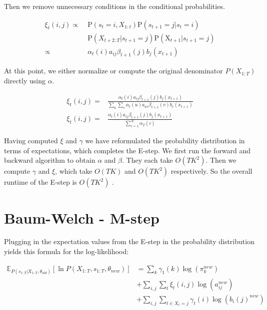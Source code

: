 Then we remove unnecessary conditions in the conditional probabilities.

\begin{equation}
\begin{aligned}
\xi_{t}(i, j) \propto \; &\mathrm{P}\left(s_{t}=i, X_{1: t}\right) \mathrm{P}\left(s_{t+1}=j | s_{t}=i\right) \\
&\mathrm{P}\left(X_{t+2: T} | s_{t+1}=j\right) \mathrm{P}\left(\mathrm{X}_{t+1} | s_{t+1}=j\right) \\
\propto \;  & \alpha_{t}(i) a_{i j} \beta_{t+1}(j) b_{j}(x_{t+1})
\end{aligned} 
\end{equation}

At this point, we either normalize or compute the original denominator $P(X_{1:T})$ directly using $\alpha$.

\begin{equation}
\begin{aligned}
\xi_{t}(i, j)=&\frac{\alpha_{t}(i) a_{i j} \beta_{t+1}(j) b_{j}(x_{t+1})}{\sum_{u} \sum_{v} \alpha_{t}(u) a_{u v} \beta_{t+1}(v) b_{v}( x_{t+1})} \\
\xi_{t}(i, j)=&\frac{\alpha_{t}(i) a_{i j} \beta_{t+1}(j) b_{j} (x_{t+1})}{\sum_{i=1}^{N} \alpha_{T}(i)}
\label{eq:xi-def}
\end{aligned}
\end{equation}

Having computed $\xi$ and $\gamma$ we have reformulated the probability distribution in terms of expectations, which completes the E-step. We first run the forward and backward algorithm to obtain $\alpha$ and $\beta$. They each take $O(TK^2)$. Then we compute $\gamma$ and $\xi$, which take $O(TK)$ and $O(TK^2)$ respectively. So the overall runtime of the E-step is $O(TK^2)$ \parencite{miningmassivedatasets}.

\section{Baum-Welch - M-step}

Plugging in the expectation values from the E-step in the probability distribution yields this formula for the log-likelihood:

\begin{equation}
\begin{aligned}
\mathbb{E}_{P\left(s_{1: T} | X_{1: T}, \theta_{o l d}\right)}\left[\ln P\left(X_{1: T}, s_{1: T}, \theta_{n e w}\right)\right] &=\sum_{k} \gamma_{1}(k) \log \left(\pi_{k}^{n e w}\right) \\
&+\sum_{i, j} \sum_{t} \xi_{t}(i, j) \log \left(a_{i j}^{n e w}\right) \\
&+\sum_{i, j} \sum_{t \in X_t = j} \gamma_{t}(i)   \log \left(b_{i}(j)^{n e w}\right)
\end{aligned}
\end{equation}

